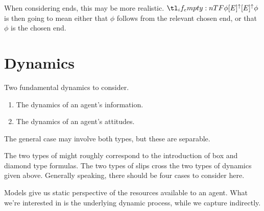 \documentclass[10pt]{article}
\makeatletter
\renewcommand\lbrack[1][]{\ooalign{\ensuremath{#1\lfloor}\cr\ensuremath{#1\lceil}}}
\renewcommand\rbrack[1][]{\ooalign{\ensuremath{#1\rfloor}\cr\ensuremath{#1\rceil}}}
\newcommand{\llbrack}[1][]{\savebox{\@bry}{\(\m@th{#1\lbrack}\)}%
  \mathopen{\usebox{\@bry}\kern-0.7\wd\@bry\usebox{\@bry}}}
\newcommand{\rrbrack}[1][]{\savebox{\@bry}{\(\m@th{#1\rbrack}\)}%
  \mathclose{\usebox{\@bry}\kern-0.7\wd\@bry\usebox{\@bry}}}
\newcommand{\sem}[1]{\ensuremath{\llbrack{#1}\rrbrack}}
\makeatother
\begin{document}

When considering ends, this may be more realistic.
\(\lattu[E]{\phi}\) is then going to mean either that \(\phi\) follows from the relevant chosen end, or that \(\phi\) is the chosen end.








\section{Dynamics}
\label{sec:dynamics}

Two fundamental dynamics to consider.
\begin{enumerate}
\item The dynamics of an agent's information.
\item The dynamics of an agent's attitudes.
\end{enumerate}
The general case may involve both types, but these are separable.

The two types of might roughly correspond to the introduction of box and diamond type formulas.
The two types of slips cross the two types of dynamics given above.
Generally speaking, there should be four cases to consider here.





Models give us static perspective of the resources available to an agent.
What we're interested in is the underlying dynamic process, while we capture indirectly.





\end{document}
